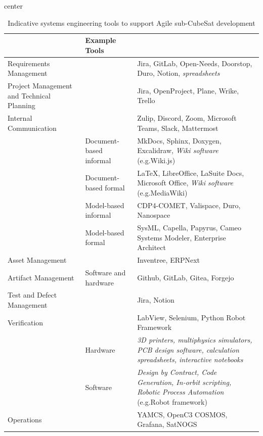 \documentclass[a4paper,nobib,justified,final]{tufte-book}
\begin{document}
\begin{table}[h]
	\renewcommand\tabularxcolumn[1]{m{#1}}%
	\begin{adjustbox}{center}
	\begin{tabularx}{1.1\textwidth}{@{}>{\raggedright}m{3.6cm}>{\raggedright\footnotesize}m{2.5cm}X@{}}
		\toprule
		\multicolumn{2}{l}{Task} & Example Tools \\ \midrule
		Requirements Management \cite{pankevichOpenSourceRequirements2025} & & Jira, GitLab, Open-Needs, Doorstop, Duro, Notion, \emph{spreadsheets} \\
		\addlinespace[2ex]
		Project Management and Technical Planning &  & Jira, OpenProject, Plane, Wrike, Trello \\
		\addlinespace[2ex]
		Internal Communication \cite{grafEuropeanAlternativesSlack} & & Zulip, Discord, Zoom, Microsoft Teams, Slack, Mattermost \\
		\addlinespace[2ex]
		\multirow{4}{*}{Knowledge Management} & Document-based informal & MkDocs, Sphinx, Doxygen, Excalidraw, \textit{Wiki software} (e.g.\@ Wiki.js) \\
		& Document-based formal & LaTeX, LibreOffice, LaSuite Docs, Microsoft Office, \textit{Wiki software} (e.g.\@ MediaWiki)  \\
		& Model-based informal \cite{morlingGunnarmorlingAwesomeopensourcedataengineering2024} & CDP4-COMET, Valispace, Duro, Nanospace \\
		& Model-based formal & SysML, Capella, Papyrus, Cameo Systems Modeler, Enterprise Architect \\
		\addlinespace[2ex]
		Asset Management & & Inventree, ERPNext \\
		\addlinespace[2ex]
		Artifact Management & Software and hardware & Github, GitLab, Gitea, Forgejo \\
		\addlinespace[2ex]
		Test and Defect Management &  & Jira, Notion \\
		\addlinespace[2ex]
		Verification &  & LabView, Selenium, Python Robot Framework \\
		\addlinespace[2ex]
		\multirow{2}{*}{Implementation} & Hardware & \textit{3D printers, multiphysics simulators, \acs{PCB} design software, calculation spreadsheets, interactive notebooks} \\
		& Software & \textit{Design by Contract, Code Generation, In-orbit scripting, Robotic Process Automation} (e.g.\@ Robot framework) \\
		\addlinespace[2ex]
		Operations & & YAMCS, OpenC3 COSMOS, Grafana, SatNOGS \\
		\bottomrule
	\end{tabularx}
	\end{adjustbox}
	\caption{Indicative systems engineering tools to support Agile sub-CubeSat development}
	\label{tab:methodology_indicative_tools}
\end{table}
\end{document}
